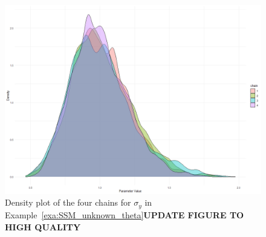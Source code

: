 \begin{figure}
	\centering
	\includegraphics[width=\textwidth]{sigma_x_density_plot.png}
	\caption{Density plot of the four chains for $\sigma_y$ in Example~\ref{exa:SSM_unknown_theta}\textbf{UPDATE FIGURE TO HIGH QUALITY}}
	\label{fig:sigma_y_dens}
\end{figure}